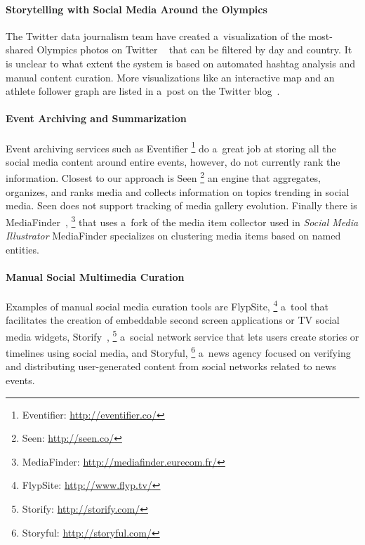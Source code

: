 \documentclass{sig-alternate}
\newcommand{\inlinelistingsize}{\fontsize{8pt}{11pt}}
\let\oldurl\url
\renewcommand{\url}[1]{\inlinelistingsize\oldurl{#1}}
\begin{document}
\paragraph{Storytelling with Social Media Around the Olympics}

The Twitter data journalism team have created a~visualization
of the most-shared Olympics photos on Twitter%
~\cite{schweitzer2014twitter} that can be
filtered by day and country.
It is unclear to what extent the system is based
on automated hashtag analysis and manual content curation.
More visualizations like an interactive map
and an athlete follower graph
are listed in a~post on the Twitter blog~\cite{rogers2014twitter}.

\paragraph{Event Archiving and Summarization}

Event archiving services such as Eventifier%
\footnote{Eventifier: \url{http://eventifier.co/}} 
do a~great job at storing all the social media content around
entire events, however, do not currently rank the information.
Closest to our approach is Seen%
\footnote{Seen: \url{http://seen.co/}}
an engine that aggregates, organizes, and ranks media
and collects information on topics trending in social media.
Seen does not support tracking of media gallery evolution.
Finally there is MediaFinder~\cite{troncy2013mediafinder},%
\footnote{MediaFinder: \url{http://mediafinder.eurecom.fr/}}
that uses a~fork of the media item collector
used in \emph{Social Media Illustrator}
MediaFinder specializes on clustering media items
based on named entities.

\paragraph{Manual Social Multimedia Curation}

Examples of manual social media curation tools are FlypSite,%
\footnote{FlypSite: \url{http://www.flyp.tv/}}
a~tool that facilitates the creation of embeddable
second screen applications or TV social media widgets,
Storify~\cite{fincham2011storify,atasoy2011storify},%
\footnote{Storify: \url{http://storify.com/}}
a~social network service that lets users create stories
or timelines using social media, and Storyful,%
\footnote{Storyful: \url{http://storyful.com/}}
a~news agency focused on verifying and distributing
user-generated content from social networks related to news events.
\end{document}
